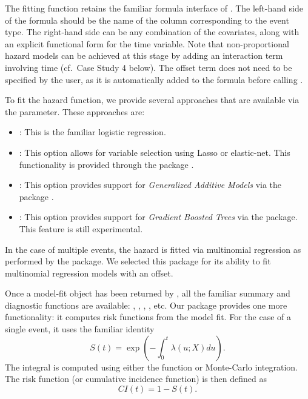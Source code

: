 \documentclass[
]{jss}
\providecommand{\tightlist}{%
  \setlength{\itemsep}{0pt}\setlength{\parskip}{0pt}}
\begin{document}
The fitting function retains the familiar formula interface of
. The left-hand side of the formula should be the name of the
column corresponding to the event type. The right-hand side can be any
combination of the covariates, along with an explicit functional form
for the time variable. Note that non-proportional hazard models can be
achieved at this stage by adding an interaction term involving time
(cf.~Case Study 4 below). The offset term does not need to be specified
by the user, as it is automatically added to the formula before calling
.

To fit the hazard function, we provide several approaches that are
available via the  parameter. These approaches are:

\begin{itemize}
\tightlist
\item
  : This is the familiar logistic regression.
\item
  : This option allows for variable selection using Lasso
  or elastic-net. This functionality is provided through the
   package \citep{friedman2010jss}.
\item
  : This option provides support for \emph{Generalized
  Additive Models} via the  package
  \citep{hastie1987generalized}.
\item
  : This option provides support for \emph{Gradient Boosted
  Trees} via the  package. This feature is still experimental.
\end{itemize}

In the case of multiple events, the hazard is fitted via multinomial
regression as performed by the  package. We selected this
package for its ability to fit multinomial regression models with an
offset.

Once a model-fit object has been returned by , all
the familiar summary and diagnostic functions are available:
, , , , etc. Our
package provides one more functionality: it computes risk functions from
the model fit. For the case of a single event, it uses the familiar
identity \begin{equation}\label{eqn:surv}
S(t) = \exp\left(-\int_0^t \lambda(u;X) du\right).
\end{equation} The integral is computed using either the
 function or Monte-Carlo integration. The risk
function (or cumulative incidence function) is then defined as
\begin{equation}\label{eqn:CI}
CI(t) = 1 - S(t).
\end{equation}
\end{document}
